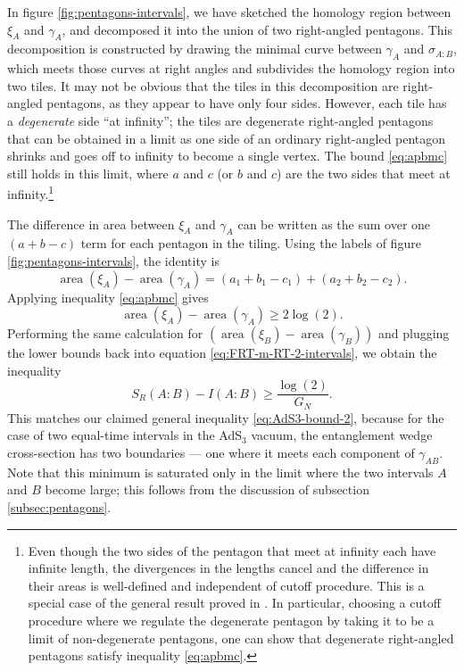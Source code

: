 \documentclass[a4paper,11pt]{article}
\newcommand{\area}{\operatorname{area}}
\begin{document}
In figure \ref{fig:pentagons-intervals}, we have sketched the homology region between $\xi_A$ and $\gamma_A$, and decomposed it into the union of two right-angled pentagons. This decomposition is constructed by drawing the minimal curve between $\gamma_A$ and $\sigma_{A:B}$, which meets those curves at right angles and subdivides the homology region into two tiles. It may not be obvious that the tiles in this decomposition are right-angled pentagons, as they appear to have only four sides. However, each tile has a \emph{degenerate} side ``at infinity''; the tiles are degenerate right-angled pentagons that can be obtained in a limit as one side of an ordinary right-angled pentagon shrinks and goes off to infinity to become a single vertex. The bound \eqref{eq:apbmc} still holds in this limit, where $a$ and $c$ (or $b$ and $c$) are the two sides that meet at infinity.\footnote{Even though the two sides of the pentagon that meet at infinity each have infinite length, the divergences in the lengths cancel and the difference in their areas is well-defined and independent of cutoff procedure. This is a special case of the general result proved in \cite{sorce-cutoffs}. In particular, choosing a cutoff procedure where we regulate the degenerate pentagon by taking it to be a limit of non-degenerate pentagons, one can show that degenerate right-angled pentagons satisfy inequality \eqref{eq:apbmc}.}

The difference in area between $\xi_A$ and $\gamma_A$ can be written as the sum over one $(a + b - c)$ term for each pentagon in the tiling. Using the labels of figure \ref{fig:pentagons-intervals}, the identity is
\begin{equation}
    \area(\xi_A) - \area(\gamma_A) = (a_1 + b_1 - c_1) + (a_2 + b_2 - c_2).
\end{equation}
Applying inequality \eqref{eq:apbmc} gives
\begin{equation}
    \area(\xi_A) - \area(\gamma_A) \geq 2 \log(2).
\end{equation}
Performing the same calculation for $(\area(\xi_B) - \area(\gamma_B))$ and plugging the lower bounds back into equation \eqref{eq:FRT-m-RT-2-intervals}, we obtain the inequality
\begin{equation}
    S_R(A:B) - I(A:B)
        \geq \frac{\log(2)}{G_N}.
\end{equation}
This matches our claimed general inequality \eqref{eq:AdS3-bound-2}, because for the case of two equal-time intervals in the AdS$_3$ vacuum, the entanglement wedge cross-section has two boundaries --- one where it meets each component of $\gamma_{AB}$. Note that this minimum is saturated only in the limit where the two intervals $A$ and $B$ become large; this follows from the discussion of subsection \ref{subsec:pentagons}.
\end{document}
